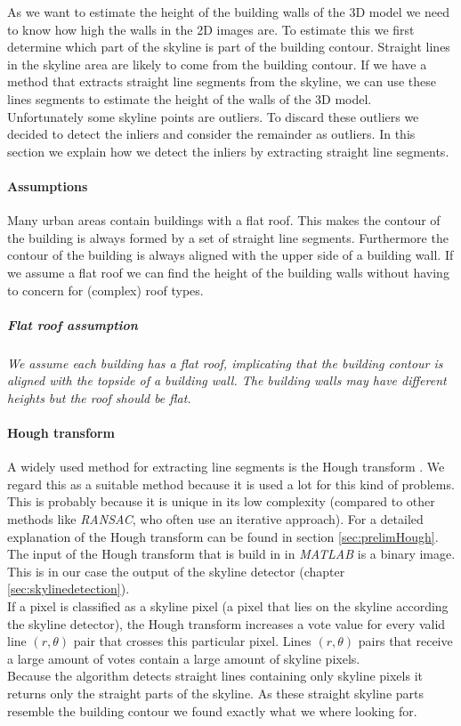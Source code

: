 	As we want to estimate the height of the building walls of the 3D model we
	need to know how high the walls in the 2D images are.  To estimate this we
	first determine which part of the skyline is part of the building contour.
	Straight lines in the skyline area are likely to come from the building
	contour.  If we have a method that extracts straight line segments from the
	skyline, we can use these lines segments to estimate the height of the walls
	of the 3D model.\\
	Unfortunately some skyline points are outliers. To discard these outliers
	we decided to detect the inliers and consider the remainder as outliers.  In this
	section we explain how we detect the inliers by extracting straight line
	segments.  \\

\paragraph{Assumptions}
	Many urban areas contain buildings with a flat roof. This makes the contour
	of the building is always formed by a set of straight line segments.
	Furthermore the contour of the building is always aligned with the upper side
	of a building wall.  
	If we assume a flat roof we can find the height of the building walls without
	having to concern for (complex) roof types.

	\subparagraph{Flat roof assumption}
	\emph{We assume each building has a flat roof, implicating that the building
	contour is aligned with the topside of a building wall.  The building walls
	may have different heights but the roof should be flat.}\\


\paragraph{Hough transform}
	A widely used method for extracting line segments is the Hough transform
	\cite{Hough}.
	We regard this as a suitable method because it is
	used a lot for this kind of problems. This is probably because it is unique
	in its low complexity (compared to other methods like
	\emph{RANSAC}, who often use an iterative approach).
	For a detailed explanation of the Hough transform can be found in section
	\ref{sec:prelimHough}.\\

	The input of the Hough transform that is build in in \emph{MATLAB} is a binary
	image. This is in our case the output of the skyline detector (chapter
	\ref{sec:skylinedetection}).\\
	If a pixel is classified as a skyline pixel (a pixel that lies on the
	skyline according the skyline detector), the Hough transform increases
	a vote value for every valid line $(r,\theta)$ pair that crosses this
	particular pixel.  
	Lines $(r,\theta)$ pairs that receive a large amount of votes
	contain a large amount of skyline pixels.\\
	Because the algorithm detects straight lines containing only skyline pixels
	it returns only the straight parts of the skyline.
	As these straight skyline parts resemble the building contour
	we found exactly what we where looking for.\\

